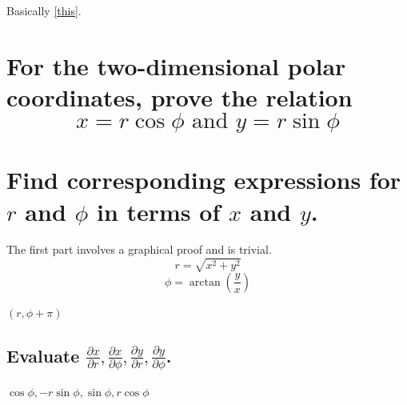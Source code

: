 \documentclass[answers]{exam}
\begin{document}
\begin{questions}
\begin{solution}
	Basically \ref{this}.
\end{solution}

\question{}
\begin{parts}
	\part{For the two-dimensional polar coordinates, prove the relation
		$$x = r\cos\phi \text{ and } y = r\sin\phi$$
	}
	\part{Find corresponding expressions for $r$ and $\phi$ in terms of $x$ and $y$.}
\end{parts}

\begin{solution}
	The first part involves a graphical proof and is trivial.
	$$r = \sqrt{x^2 + y^2}$$
	$$\phi = \arctan\left(\frac{y}{x}\right)$$
\end{solution}


\begin{solution}
	$(r, \phi+\pi)$
\end{solution}


\begin{parts}
	\part{Evaluate $\frac{\partial x}{\partial r}, \frac{\partial x}{\partial \phi}, \frac{\partial y}{\partial r}, \frac{\partial y}{\partial \phi}$.}
	
	\begin{solution}
		$\cos\phi, -r\sin\phi, \sin\phi, r\cos\phi$
	\end{solution}


\end{parts}
\end{questions}
\end{document}
